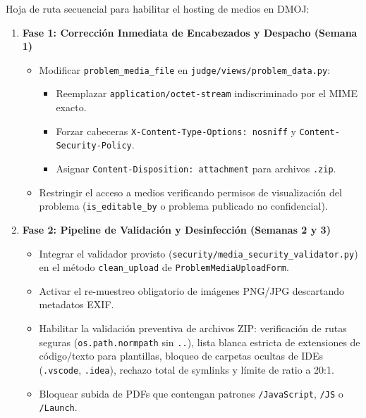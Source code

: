 \documentclass[11pt,a4paper]{article}
\begin{document}
Hoja de ruta secuencial para habilitar el hosting de medios en DMOJ:

\begin{enumerate}[leftmargin=*]
    \item \textbf{Fase 1: Corrección Inmediata de Encabezados y Despacho (Semana 1)}
    \begin{itemize}
        \item Modificar \texttt{problem\_media\_file} en \texttt{judge/views/problem\_data.py}:
        \begin{itemize}
            \item Reemplazar \texttt{application/octet-stream} indiscriminado por el MIME exacto.
            \item Forzar cabeceras \texttt{X-Content-Type-Options: nosniff} y \texttt{Content-Security-Policy}.
            \item Asignar \texttt{Content-Disposition: attachment} para archivos \texttt{.zip}.
        \end{itemize}
        \item Restringir el acceso a medios verificando permisos de visualización del problema (\texttt{is\_editable\_by} o problema publicado no confidencial).
    \end{itemize}

    \item \textbf{Fase 2: Pipeline de Validación y Desinfección (Semanas 2 y 3)}
    \begin{itemize}
        \item Integrar el validador provisto (\texttt{security/media\_security\_validator.py}) en el método \texttt{clean\_upload} de \texttt{ProblemMediaUploadForm}.
        \item Activar el re-muestreo obligatorio de imágenes PNG/JPG descartando metadatos EXIF.
        \item Habilitar la validación preventiva de archivos ZIP: verificación de rutas seguras (\texttt{os.path.normpath} sin \texttt{..}), lista blanca estricta de extensiones de código/texto para plantillas, bloqueo de carpetas ocultas de IDEs (\texttt{.vscode}, \texttt{.idea}), rechazo total de symlinks y límite de ratio a 20:1.
        \item Bloquear subida de PDFs que contengan patrones \texttt{/JavaScript}, \texttt{/JS} o \texttt{/Launch}.
    \end{itemize}


\end{enumerate}
\end{document}
